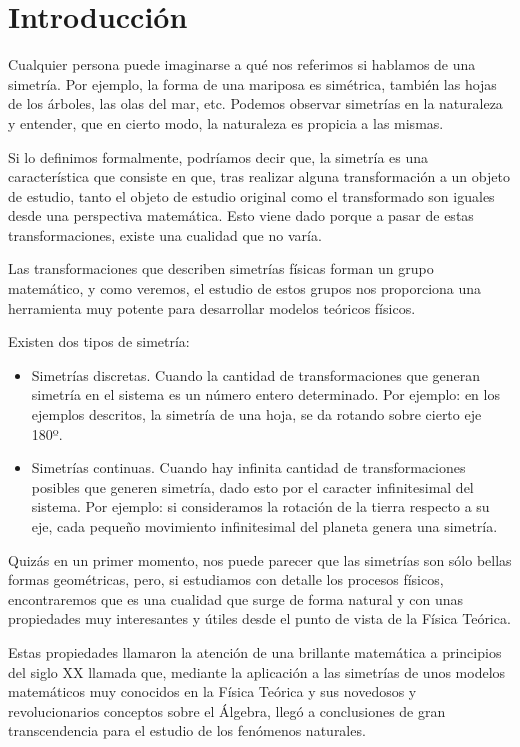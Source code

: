 \section{Introducción}\label{sec:introduccion}

Cualquier persona puede imaginarse a qué nos referimos si hablamos de una simetría. Por ejemplo, la forma de una mariposa es simétrica, también las hojas de los árboles, las olas del mar, etc. Podemos observar simetrías en la naturaleza y entender, que en cierto modo, la naturaleza es propicia a las mismas.

Si lo definimos formalmente, podríamos decir que, la simetría es una característica que consiste en que, tras realizar alguna transformación a un objeto de estudio, tanto el objeto de estudio original como el transformado son iguales desde una perspectiva matemática. Esto viene dado porque a pasar de estas transformaciones, existe una cualidad que no varía.

Las transformaciones que describen simetrías físicas forman un grupo matemático, y como veremos, el estudio de estos grupos nos proporciona una herramienta muy potente para desarrollar modelos teóricos físicos.

Existen dos tipos de simetría:
\begin{itemize}
    \item Simetrías discretas. Cuando la cantidad de transformaciones que generan simetría en el sistema es un número entero determinado. Por ejemplo: en los ejemplos descritos, la simetría de una hoja, se da rotando sobre cierto eje 180º.
    \item Simetrías continuas. Cuando hay infinita cantidad de transformaciones posibles que generen simetría, dado esto por el caracter infinitesimal del sistema. Por ejemplo: si consideramos la rotación de la tierra respecto a su eje, cada pequeño movimiento infinitesimal del planeta genera una simetría.
\end{itemize}

Quizás en un primer momento, nos puede parecer que las simetrías son sólo bellas formas geométricas, pero, si estudiamos con detalle los procesos físicos, encontraremos que es una cualidad que surge de forma natural y con unas propiedades muy interesantes y útiles desde el punto de vista de la Física Teórica.

Estas propiedades llamaron la atención de una brillante matemática a principios del siglo XX llamada  que, mediante la aplicación a las simetrías de unos modelos matemáticos muy conocidos en la Física Teórica y sus novedosos y revolucionarios conceptos sobre el Álgebra, llegó a conclusiones de gran transcendencia para el estudio de los fenómenos naturales.

